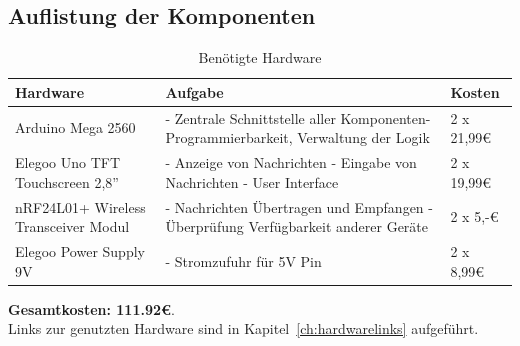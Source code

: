 \documentclass[a4paper, 11pt]{scrartcl}
\begin{document}
\subsection{Auflistung der Komponenten}
\begin{small}

\begin{table}[H]
    \caption{Benötigte Hardware}\label{tab:hardware}
    \begin{tabular}{|p{}|p{}|p{}|}
        \hline
        \textbf{Hardware} & \textbf{Aufgabe} & \textbf{Kosten}
        \\
        \hline\hline
        Arduino Mega 2560 
        & 
        - Zentrale Schnittstelle aller Komponenten\newline - Programmierbarkeit, Verwaltung der Logik
        & 
        2 x 21,99€
        \\
        \hline
        Elegoo Uno TFT Touchscreen 2,8''
        &
        - Anzeige von Nachrichten
        \newline - Eingabe von Nachrichten
        \newline - User Interface
        &
        2 x 19,99€
        \\
        \hline
        nRF24L01+ Wireless Transceiver Modul
        &
        - Nachrichten Übertragen und Empfangen
        \newline - Überprüfung Verfügbarkeit anderer Geräte
        &
        2 x 5,-€
        \\
        \hline
        Elegoo Power Supply 9V
        &
        - Stromzufuhr für 5V Pin
        &
        2 x 8,99€
        \\
        \hline
    \end{tabular}
\end{table}
\textbf{Gesamtkosten: 111.92€}. 
\\
Links zur genutzten Hardware sind in Kapitel~\ref{ch:hardwarelinks} aufgeführt.


\end{small}
\end{document}

